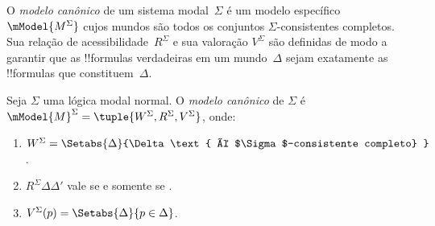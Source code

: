 \documentclass[../../../include/open-logic-section]{subfiles}
\begin{document}


O \emph{modelo canônico} de um sistema modal~$\Sigma$ é um modelo
específico~$\mModel{M^\Sigma}$ cujos mundos são todos os conjuntos
$\Sigma$-consistentes completos. Sua relação de
acessibilidade~$R^\Sigma$ e sua valoração $V^\Sigma$ são definidas de
modo a garantir que as !!{formula}s verdadeiras em um mundo~$\Delta$
sejam exatamente as !!{formula}s que constituem~$\Delta$.

\begin{defn}
  Seja $\Sigma$ uma lógica modal normal. O \emph{modelo canônico} de
  $\Sigma$ é $\mModel{M}^\Sigma = \tuple{W^\Sigma, R^\Sigma,
    V^\Sigma}$, onde:
  \begin{enumerate}
  \item $W^\Sigma = \Setabs{ \Delta }{\Delta \text{
      é $\Sigma$-consistente completo} }$.
  \item $R^\Sigma \Delta\Delta'$ vale se e somente se
    .
  \item $V^\Sigma(p) = \Setabs{\Delta}{p \in \Delta}$.
  \end{enumerate}
\end{defn}
\end{document}
